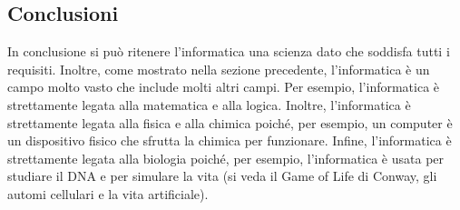 \subsection{Conclusioni}

In conclusione si può ritenere l'informatica una scienza dato che soddisfa tutti i requisiti. Inoltre, come mostrato nella sezione precedente, l'informatica è un campo molto vasto che include molti altri campi. Per esempio, l'informatica è strettamente 
legata alla matematica e alla logica. Inoltre, l'informatica è strettamente legata alla fisica e alla chimica poiché, per esempio, un computer è un dispositivo fisico che sfrutta la chimica per funzionare. Infine, l'informatica è strettamente legata alla 
biologia poiché, per esempio, l'informatica è usata per studiare il DNA e per simulare la vita (si veda il Game of Life di Conway, gli automi cellulari e la vita artificiale).